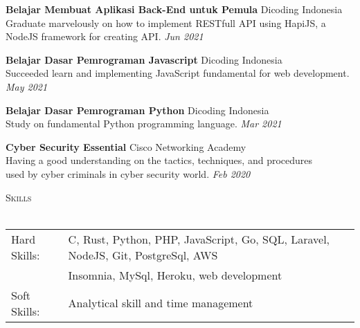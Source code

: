 \documentclass[a4paper]{article}
\newcommand{\lineunder} {
    \vspace*{-8pt} \\
    \hspace*{-18pt} \hrulefill \\
}
\newcommand{\header} [1] {
    {\hspace*{-18pt}\vspace*{6pt} \textsc{#1}}
    \vspace*{-6pt} \lineunder
}
\begin{document}
\textbf{Belajar Membuat Aplikasi Back-End untuk Pemula} \hfill Dicoding Indonesia\\
Graduate marvelously on how to implement RESTfull API using HapiJS, a NodeJS framework for creating API. \hfill \textit{Jun 2021}\\
\vspace*{2mm}

\textbf{Belajar Dasar Pemrograman Javascript} \hfill Dicoding Indonesia\\
Succeeded learn and implementing JavaScript fundamental for web development. \hfill \textit{May 2021}\\
\vspace*{2mm}

\textbf{Belajar Dasar Pemrograman Python} \hfill Dicoding Indonesia\\
Study on fundamental Python programming language. \hfill \textit{Mar 2021}\\
\vspace*{2mm}

\textbf{Cyber Security Essential} \hfill Cisco Networking Academy\\
Having a good understanding on the tactics, techniques, and procedures \\used by cyber criminals in cyber security world. \hfill \textit{Feb 2020}\\
\vspace*{2mm}

\header{Skills}
\begin{tabular}{ l l }
	Hard Skills:              & C, Rust, Python, PHP, JavaScript, Go, SQL, Laravel, NodeJS, Git, PostgreSql, AWS\\ & Insomnia, MySql, Heroku, web development\\
	Soft Skills:                    & Analytical skill and time management\\
\end{tabular}
\vspace{2mm}

\ 
\end{document}
